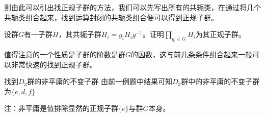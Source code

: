 则由此可以引出找正规子群的方法，我们可以先写出所有的共轭类，在通过将几个共轭类组合起来，找到运算封闭的共轭类组合便可以得到正规子群。

\begin{exercise}{}
设群$G$有一子群$H$，其共轭子群$H_i=g_iH_ig^{-1}$。证明$\prod_{g_i\in G}H_i$为其正规子群。
\end{exercise}
值得注意的一个性质是子群的阶数是群$G$的因数，这与前几条条件组合起来一般可以非常快速的找到正规子群。

\begin{example}{找到$D_3$群的非平庸的不变子群}
由前一例题中结果可知$D_3$群中的非平庸的不变子群为$\{e,d,f\}$

注：非平庸是值排除显然的正规子群$\{e\}$与群$G$本身。
\end{example}
